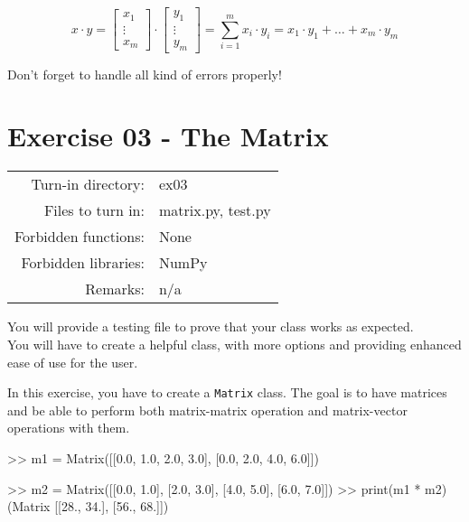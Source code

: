 \documentclass[]{article}
\newenvironment{Shaded}{\begin{snugshade}}{\end{snugshade}}
\newcommand{\BuiltInTok}[1]{\textcolor[rgb]{0.50,0.55,0.55}{#1}}
\newcommand{\FloatTok}[1]{\textcolor[rgb]{0.96,0.45,0.00}{#1}}
\newcommand{\NormalTok}[1]{\textcolor[rgb]{0.81,0.81,0.76}{#1}}
\newcommand{\OperatorTok}[1]{\textcolor[rgb]{0.81,0.81,0.76}{#1}}
\begin{document}
\large

\[
x \cdot y = \begin{bmatrix} x_1 \\ \vdots \\ x_m\end{bmatrix} 
\cdot 
\begin{bmatrix} y_1 \\ \vdots \\ y_m\end{bmatrix} = 
\sum_{i = 1}^{m} x_i \cdot y_i =  x_1 \cdot y_1 + \dots + x_m \cdot y_m 
\] \normalsize

Don't forget to handle all kind of errors properly!

\clearpage

\hypertarget{exercise-03---the-matrix-1}{%
\section{Exercise 03 - The Matrix}\label{exercise-03---the-matrix-1}}

\begin{longtable}[]{@{}rl@{}}
\toprule
\endhead
Turn-in directory: & ex03\tabularnewline
Files to turn in: & matrix.py, test.py\tabularnewline
Forbidden functions: & None\tabularnewline
Forbidden libraries: & NumPy\tabularnewline
Remarks: & n/a\tabularnewline
\bottomrule
\end{longtable}

You will provide a testing file to prove that your class works as
expected.\\
You will have to create a helpful class, with more options and providing
enhanced ease of use for the user.

In this exercise, you have to create a \texttt{Matrix} class. The goal
is to have matrices and be able to perform both matrix-matrix operation
and matrix-vector operations with them.

\begin{Shaded}
\begin{Highlighting}[]
\OperatorTok{>>}\NormalTok{ m1 }\OperatorTok{=}\NormalTok{ Matrix([[}\FloatTok{0.0}\NormalTok{, }\FloatTok{1.0}\NormalTok{, }\FloatTok{2.0}\NormalTok{, }\FloatTok{3.0}\NormalTok{], }
\NormalTok{                [}\FloatTok{0.0}\NormalTok{, }\FloatTok{2.0}\NormalTok{, }\FloatTok{4.0}\NormalTok{, }\FloatTok{6.0}\NormalTok{]])}

\OperatorTok{>>}\NormalTok{ m2 }\OperatorTok{=}\NormalTok{ Matrix([[}\FloatTok{0.0}\NormalTok{, }\FloatTok{1.0}\NormalTok{],}
\NormalTok{                [}\FloatTok{2.0}\NormalTok{, }\FloatTok{3.0}\NormalTok{],}
\NormalTok{                [}\FloatTok{4.0}\NormalTok{, }\FloatTok{5.0}\NormalTok{],}
\NormalTok{                [}\FloatTok{6.0}\NormalTok{, }\FloatTok{7.0}\NormalTok{]])}
\OperatorTok{>>} \BuiltInTok{print}\NormalTok{(m1 }\OperatorTok{*}\NormalTok{ m2)}
\NormalTok{(Matrix [[}\FloatTok{28.}\NormalTok{, }\FloatTok{34.}\NormalTok{], [}\FloatTok{56.}\NormalTok{, }\FloatTok{68.}\NormalTok{]])}
\end{Highlighting}
\end{Shaded}
\end{document}
